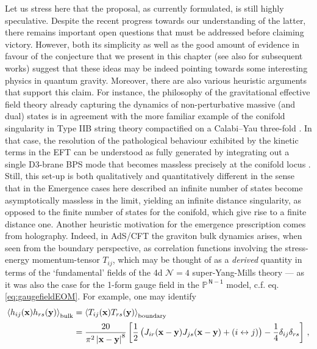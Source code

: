 Let us stress here that the proposal, as currently formulated, is still highly speculative. Despite the recent progress towards our understanding of the latter, there remains important open questions that must be addressed before claiming victory. However, both its simplicity as well as the good amount of evidence in favour of the conjecture that we present in this chapter (see also \cite{Marchesano:2022axe, Blumenhagen:2023yws,Kawamura:2023cbd,Seo:2023xsb,Blumenhagen:2023tev,Blumenhagen:2023xmk,Calderon-Infante:2023uhz,Hattab:2023moj,Casas:2024ttx,Blumenhagen:2024ydy,Hattab:2024thi,Blumenhagen:2024lmo} for subsequent works) suggest that these ideas may be indeed pointing towards some interesting physics in quantum gravity. Moreover, there are also various heuristic arguments that support this claim. For instance, the philosophy of the gravitational effective field theory already capturing the dynamics of non-perturbative massive (and dual) states is in agreement with the more familiar example of the conifold singularity in Type IIB string theory compactified on a Calabi--Yau three-fold \cite{Candelas:1990rm,Candelas:1989ug,Candelas:1989js, Aspinwall:1993nu}. In that case, the resolution of the pathological behaviour exhibited by the kinetic terms in the EFT can be understood as fully generated by integrating out a single D3-brane BPS mode that becomes massless precisely at the conifold locus \cite{Strominger:1995cz}. Still, this set-up is both qualitatively and quantitatively different in the sense that in the Emergence cases here described an infinite number of states become asymptotically massless in the limit, yielding an infinite distance singularity, as opposed to the finite number of states for the conifold, which give rise to a finite distance one. Another heuristic motivation for the emergence prescription comes from holography. Indeed, in AdS/CFT \cite{Maldacena:1997re,Witten:1998qj} the graviton bulk dynamics arises, when seen from the boundary perspective, as correlation functions involving the stress-energy momentum-tensor $T_{i j}$, which may be thought of as a \emph{derived} quantity in terms of the `fundamental' fields of the 4d $\mathcal{N}=4$ super-Yang-Mills theory --- as it was also the case for the 1-form gauge field in the $\mathbb{P}^{\,\mathsf{N-1}}$ model, c.f. eq. \eqref{eq:gaugefieldEOM}. For example, one may identify \cite{Mueck:1998ug,Liu:1998bu}
%
\begin{align}
\braket{h_{i j} (\mathbf{x}) h_{r s} (\mathbf{y})}_{\rm bulk} &= \braket{T_{i j} (\mathbf{x}) T_{r s} (\mathbf{y})}_{\rm boundary} \notag\\
&= \frac{20}{\pi^2 \left| \mathbf{x}-\mathbf{y}\right|^8} \left[ \frac12 \left(J_{ir} (\mathbf{x}-\mathbf{y}) J_{js} (\mathbf{x}-\mathbf{y}) + \left( i \leftrightarrow j \right) \right) -\frac14 \delta_{ij} \delta_{rs}\right]\, ,
\label{eq:2pointgravAdS}
\end{align}
